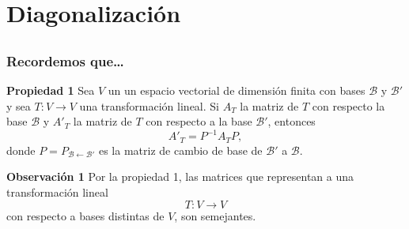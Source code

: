 \section{Diagonalización}

\subsection{}

{\nologo 
\begin{frame}\frametitle{Recordemos que\ldots }
	
	\begin{prop}{\textbf{Propiedad 1 }}
		\justifying
		Sea $V$ un un espacio vectorial de dimensión finita con bases $\mathcal{B}$ y $\mathcal{B}'$ y sea $T:V\longrightarrow V$ una transformación lineal. Si $A_T$ la matriz de $T$ con respecto la base $\mathcal{B}$ y ${A'}_T$ la matriz de $T$ con respecto a la base $\mathcal{B}'$, entonces
		\[
		{A'}_T=P^{-1}A_TP,
		\]
		donde  $P=P_{\mathcal{B} \leftarrow\mathcal{B}'}$ es la matriz de cambio de base de $\mathcal{B}'$ a $\mathcal{B}$.
	\end{prop}	
	
	\begin{alertblock}{\textbf{Observación 1 }}
		\justifying
		Por la propiedad 1, las matrices que representan a una transformación lineal 
		\[
			T:V\longrightarrow V
		\]
		con respecto a bases distintas de $V$, son semejantes.
	\end{alertblock}
	
\end{frame}
}


